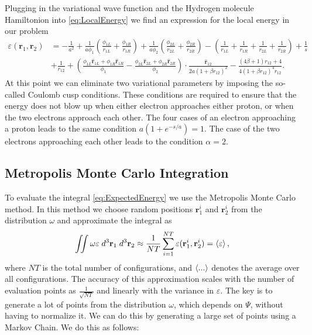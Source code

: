 \documentclass[twoside]{article}
\newcommand{\bfr}{\ensuremath{\mathbf{r}}}
\begin{document}
Plugging in the variational wave function and the Hydrogen molecule Hamiltonion into \eqref{eq:LocalEnergy} we find an expression for the local energy in our problem
\begin{equation}
\begin{split}
\varepsilon(\bfr_1,\bfr_2) &= 
-\frac{1}{a^2} 
+ \frac{1}{a\phi_1} \left(\frac{\phi_{1L}}{r_{1L}} + \frac{\phi_{1R}}{r_{1R}}\right) 
+ \frac{1}{a\phi_2} \left(\frac{\phi_{2L}}{r_{2L}} + \frac{\phi_{2R}}{r_{2R}}\right)
- \left( \frac{1}{r_{1L}}+\frac{1}{r_{1R}}+\frac{1}{r_{2L}}+\frac{1}{r_{2R}} \right) + \frac{1}{s} \\
&+ \frac{1}{r_{12}} 
+ \left( \frac{\phi_{1L}\hat{\bfr}_{1L} + \phi_{1R}\hat{\bfr}_{1R}}{\phi_1} - \frac{\phi_{2L}\hat{\bfr}_{2L} + \phi_{2R}\hat{\bfr}_{2R}}{\phi_2} \right) \cdot \frac{\hat{\bfr}_{12}}{2a(1+\beta r_{12})^2} 
- \frac{(4\beta+1)r_{12}+4}{4(1+\beta r_{12})^4 r_{12}}. 
\end{split}
\end{equation}
At this point we can eliminate two variational parameters by imposing the so-called Coulomb cusp conditions. These conditions are required to ensure that the energy does not blow up when either electron approaches either proton, or when the two electrons approach each other. The four cases of an electron approaching a proton leads to the same condition $a(1+e^{-s/a}) = 1$. The case of the two electrons approaching each other leads to the condition $\alpha = 2$.

\subsection{Metropolis Monte Carlo Integration}\label{sec:metropolis}
To evaluate the integral \eqref{eq:ExpectedEnergy} we use the Metropolis Monte Carlo method. In this method we choose random positions $\bfr_1^i$ and $\bfr_2^i$ from the distribution $\omega$ and approximate the integral as
\begin{equation}
\iint \omega \varepsilon \; d^3\bfr_1 \; d^3\bfr_2 \approx \frac{1}{NT} \sum_{i=1}^{NT} \varepsilon(\bfr_1^i,\bfr_2^i) = \braket{\varepsilon},
\end{equation}
where $NT$ is the total number of configurations, and $\braket{...}$ denotes the average over all configurations. The accuracy of this approximation scales with the number of evaluation points as $\frac{1}{\sqrt{NT}}$ and linearly with the variance in $\varepsilon$. The key is to generate a lot of points from the distribution $\omega$, which depends on $\Psi$, without having to normalize it. We can do this by generating a large set of points using a Markov Chain. We do this as follows:
\end{document}

